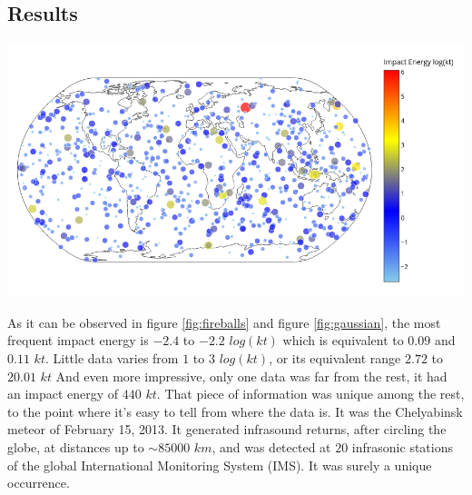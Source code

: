\documentclass[a1,portrait]{a1poster}
\begin{document}
\begin{multicols}{2}


\section*{Results}

\begin{center}\vspace{1cm}
\includegraphics[width=0.8\linewidth]{fireballs}
\label{fig:fireballs}
\end{center}\vspace{1cm}

As it can be observed in figure \ref{fig:fireballs} and figure \ref{fig:gaussian}, the most frequent
impact energy is $-2.4$ to $-2.2$ $log(kt)$ which is equivalent to $0.09$ and $0.11$ $kt$. Little
data varies from $1$ to $3$ $log(kt)$, or its equivalent range $2.72$ to $20.01$ $kt$ And even more
impressive, only one data was far from the rest, it had an impact energy of $440$ $kt$. That piece of
information was unique among the rest, to the point where it's easy to tell from where the data is. It
was the Chelyabinsk meteor of February 15, 2013. It generated infrasound returns, after circling the
globe, at distances up to $\sim85000$ $km$, and was detected at $20$ infrasonic stations of the global
International Monitoring System (IMS). \cite{key} It was surely a unique occurrence.


\end{multicols}
\end{document}
